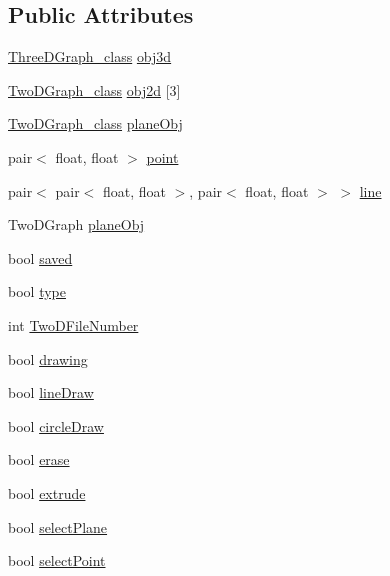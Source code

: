\subsection*{Public Attributes}
\begin{DoxyCompactItemize}
\item 
\hyperlink{classThreeDGraph__class}{Three\+D\+Graph\+\_\+class} \hyperlink{classInteractive__editor_ab0a5452e01c787797bad0624452bf555}{obj3d}
\item 
\hyperlink{classTwoDGraph__class}{Two\+D\+Graph\+\_\+class} \hyperlink{classInteractive__editor_a0974df86dfc8021afda1fcc07907671a}{obj2d} \mbox{[}3\mbox{]}
\item 
\hyperlink{classTwoDGraph__class}{Two\+D\+Graph\+\_\+class} \hyperlink{classInteractive__editor_ace6d6a503a0b62b7a8b6f87177dca677}{plane\+Obj}
\item 
pair$<$ float, float $>$ \hyperlink{classInteractive__editor_a5b1e9a4bfa2a98c594828367eeaf2acf}{point}
\item 
pair$<$ pair$<$ float, float $>$, pair$<$ float, float $>$ $>$ \hyperlink{classInteractive__editor_ab12d018a266f71e228845e7ae5bd2181}{line}
\item 
Two\+D\+Graph \hyperlink{classInteractive__editor_aed0bc7a1d2cafae39f3fbf2eb119649c}{plane\+Obj}
\item 
bool \hyperlink{classInteractive__editor_a2e6cd28cc09c6250bb5aa720acfc16a4}{saved}
\item 
bool \hyperlink{classInteractive__editor_a93c2f2041e432c8047d51942345cc3f9}{type}
\item 
int \hyperlink{classInteractive__editor_a016e5e8e9a124977ab6048c90980be97}{Two\+D\+File\+Number}
\item 
bool \hyperlink{classInteractive__editor_ace62b483a0866c64212ee0c641445c7a}{drawing}
\item 
bool \hyperlink{classInteractive__editor_aa0de8abac09ce2259252fba6c1958e83}{line\+Draw}
\item 
bool \hyperlink{classInteractive__editor_a1d7855fd44f17fb78dbb86e8b7962758}{circle\+Draw}
\item 
bool \hyperlink{classInteractive__editor_ac2f2f1dfb6c21585d4ed5ed043e41b25}{erase}
\item 
bool \hyperlink{classInteractive__editor_a3e4db48e715e92969ba3ec52ab14ce8d}{extrude}
\item 
bool \hyperlink{classInteractive__editor_a9da61abe038ee33f9d15ef4a028dc8ab}{select\+Plane}
\item 
bool \hyperlink{classInteractive__editor_ab0f07759c3ff1bcfe45d0c285abe29b5}{select\+Point}

\end{DoxyCompactItemize}
